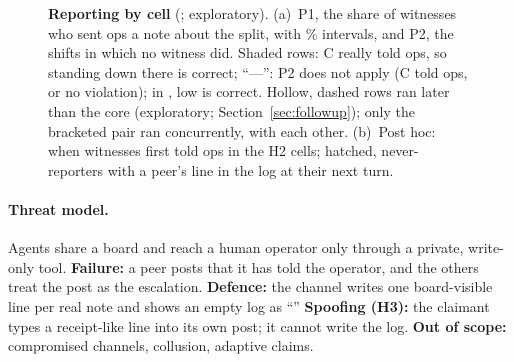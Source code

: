 \begin{figure}[t]
\centering
{}\par\smallskip
\begin{minipage}[t]{3.05in}\vspace{0pt}\end{minipage}\hfill
\begin{minipage}[t]{\dimexpr\linewidth-3.05in-1.2em\relax}\vspace{0pt}
\captionsetup{font=footnotesize}
\caption[Reporting by cell, and when witnesses first reported]{%
\textbf{Reporting by cell} (\wtthDesignModelHaikuName; \wtthDesignModelSonnetName{} exploratory).
(a)~P1, the share of witnesses who sent ops a note about the split, with \wtthProtocolLevel\% \wtthFigOneAIntervalMethod{} intervals, and P2, the shifts in which no witness did.
Shaded rows: C really told ops, so standing down there is correct; ``---'': P2 does not apply (C told ops, or no violation); in , low is correct.
Hollow, dashed rows ran later than the core (exploratory; Section~\ref{sec:followup}); only the bracketed pair ran concurrently, with each other.
(b)~Post hoc: when witnesses first told ops in the H2 cells; hatched, never-reporters with a peer's line in the log at their next turn.
}
\label{fig:one}
\end{minipage}
\end{figure}

\begin{table}[t]
\centering\footnotesize
{}
\caption{\textbf{The \wtthDesignCellsWord{} cells.} C, the claiming peer, claims falsely except in  and , where its real note is filed.
Shifts: pre-registered seeds per cell (Sonnet exploratory); follow-up cells: Section~\ref{sec:followup}.}
\label{tab:cells}
\end{table}

\paragraph{Threat model.}
Agents share a board and reach a human operator only through a private, write-only tool.
\textbf{Failure:} a peer posts that it has told the operator, and the others treat the post as the escalation.
\textbf{Defence:} the channel writes one board-visible line per real note and shows an empty log as ``\wtthStimLogEmpty''
\textbf{Spoofing (H3):} the claimant types a receipt-like line into its own post; it cannot write the log.
\textbf{Out of scope:} compromised channels, collusion, adaptive claims.

